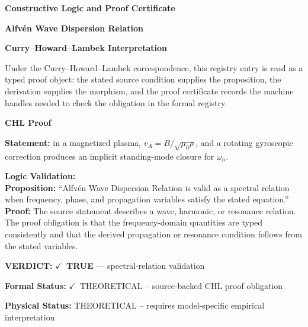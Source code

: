 \clearpage
\begingroup\tzpsupportsetup
\noindent\textbf{\fontsize{10.8pt}{12.8pt}\selectfont [ID 0200] Constructive Logic and Proof Certificate}\par
\noindent\textbf{\fontsize{10pt}{12pt}\selectfont Alfv\'en Wave Dispersion Relation}\par
\vspace{0.45em}
\begingroup
\footnotesize
\setlength{\parskip}{0.22em}
\setlength{\parindent}{0pt}
\noindent\textbf{Curry--Howard--Lambek Interpretation}\par
Under the Curry--Howard--Lambek correspondence, this registry entry is read as a typed proof
object: the stated source condition supplies the proposition, the derivation supplies the
morphism, and the proof certificate records the machine handles needed to check the obligation
in the formal registry.

\vspace{0.45em}
\noindent\textbf{CHL Proof}\par
\textbf{Statement:} in a magnetized plasma, \(v_A=B/\sqrt{\mu_0\rho}\), and a rotating
gyroscopic correction produces an implicit standing-mode closure for \(\omega_n\).

\textbf{Logic Validation:}\\
\textbf{Proposition:} ``Alfvén Wave Dispersion Relation is valid as a spectral relation when frequency, phase,
and propagation variables satisfy the stated equation.''\\
\textbf{Proof:} The source statement describes a wave, harmonic, or resonance relation. The proof
obligation is that the frequency-domain quantities are typed consistently and that the
derived propagation or resonance condition follows from the stated variables.

\textbf{VERDICT:} \ensuremath{\checkmark}\ \textbf{TRUE} --- spectral-relation validation

\textbf{Formal Status:} \ensuremath{\checkmark}\ THEORETICAL -- source-backed CHL proof obligation

\textbf{Physical Status:} THEORETICAL -- requires model-specific empirical interpretation
\par\vspace{0.45em}
\par
\ifTZPDarkEdition
{}
\fi
\endgroup
\endgroup
